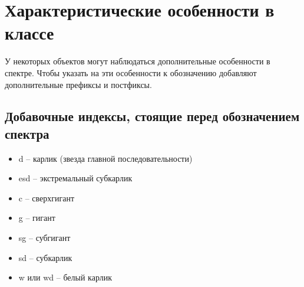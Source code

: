 \documentclass[12pt,a4paper]{article}
\begin{document}
\section{Характеристические особенности в классе}
У некоторых объектов могут наблюдаться дополнительные особенности в спектре. Чтобы указать на эти особенности к обозначению добавляют дополнительные префиксы и постфиксы.
\subsection{Добавочные индексы, стоящие перед обозначением спектра}
\begin{itemize}
\item d -- карлик (звезда главной последовательности)
\item esd -- экстремальный субкарлик
\item c -- сверхгигант
\item g -- гигант
\item sg -- субгигант
\item sd -- субкарлик
\item w или wd -- белый карлик
\end{itemize}
\end{document}
